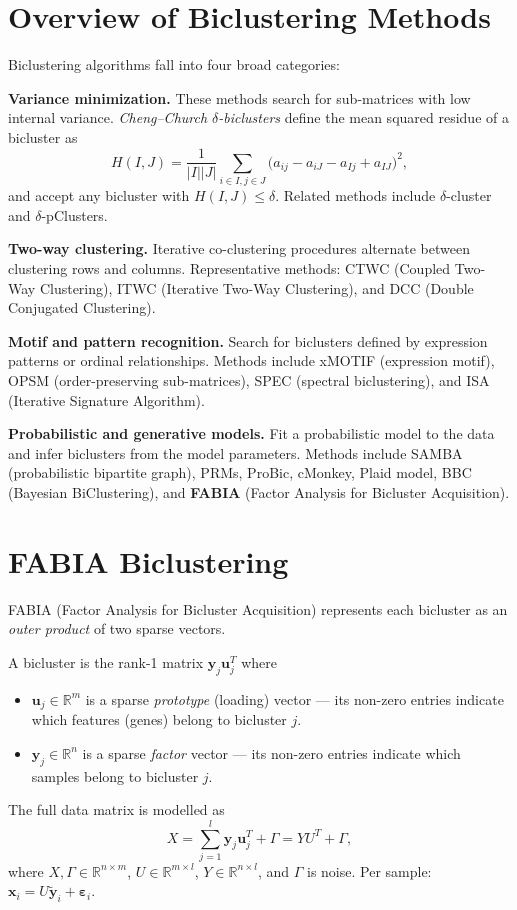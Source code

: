 \documentclass[11pt, oneside]{book}
\begin{document}
\section{Overview of Biclustering Methods}

Biclustering algorithms fall into four broad categories:

\textbf{Variance minimization.}
These methods search for sub-matrices with low internal variance.
\emph{Cheng–Church $\delta$-biclusters} define the mean squared residue of a bicluster as
\[
  H(I,J) = \frac{1}{|I||J|} \sum_{i\in I, j\in J} \bigl(a_{ij} - a_{iJ} - a_{Ij} + a_{IJ}\bigr)^2,
\]
and accept any bicluster with $H(I,J)\leq\delta$.
Related methods include $\delta$-cluster and $\delta$-pClusters.

\textbf{Two-way clustering.}
Iterative co-clustering procedures alternate between clustering rows and columns.
Representative methods: CTWC (Coupled Two-Way Clustering), ITWC (Iterative Two-Way Clustering),
and DCC (Double Conjugated Clustering).

\textbf{Motif and pattern recognition.}
Search for biclusters defined by expression patterns or ordinal relationships.
Methods include xMOTIF (expression motif), OPSM (order-preserving sub-matrices),
SPEC (spectral biclustering), and ISA (Iterative Signature Algorithm).

\textbf{Probabilistic and generative models.}
Fit a probabilistic model to the data and infer biclusters from the model parameters.
Methods include SAMBA (probabilistic bipartite graph), PRMs, ProBic, cMonkey, Plaid model,
BBC (Bayesian BiClustering), and \textbf{FABIA} (Factor Analysis for Bicluster Acquisition).

\section{FABIA Biclustering}

FABIA (Factor Analysis for Bicluster Acquisition) represents each bicluster as an
\emph{outer product} of two sparse vectors.

\begin{defbox}[title={FABIA Bicluster Representation}]
A bicluster is the rank-1 matrix $\mathbf{y}_j \mathbf{u}_j^T$ where
\begin{itemize}
  \item $\mathbf{u}_j \in \mathbb{R}^m$ is a sparse \emph{prototype} (loading) vector — its non-zero entries
        indicate which features (genes) belong to bicluster $j$.
  \item $\mathbf{y}_j \in \mathbb{R}^n$ is a sparse \emph{factor} vector — its non-zero entries
        indicate which samples belong to bicluster $j$.
\end{itemize}
The full data matrix is modelled as
\[
  X = \sum_{j=1}^{l} \mathbf{y}_j \mathbf{u}_j^T + \Gamma = Y U^T + \Gamma,
\]
where $X, \Gamma \in \mathbb{R}^{n \times m}$, $U \in \mathbb{R}^{m \times l}$, $Y \in \mathbb{R}^{n \times l}$,
and $\Gamma$ is noise.
Per sample: $\mathbf{x}_i = U \tilde{\mathbf{y}}_i + \boldsymbol{\varepsilon}_i$.
\end{defbox}
\end{document}

